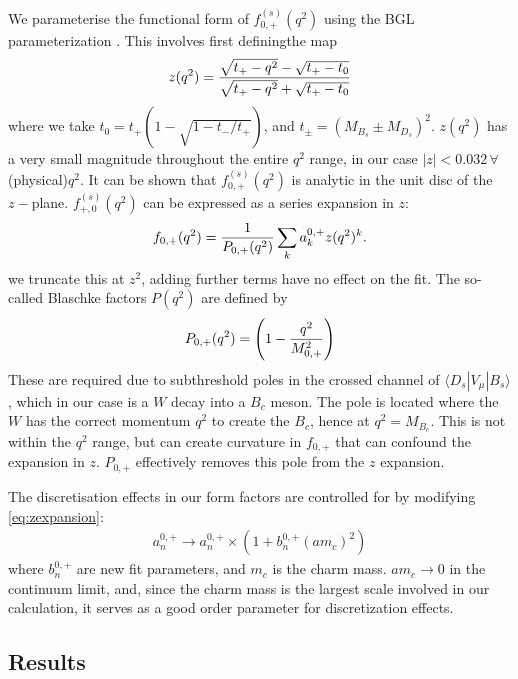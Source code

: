 We parameterise the functional form of $f^{(s)}_{0,+}(q^2)$ using the BGL parameterization \cite{PhysRevD.79.013008}. This involves first definingthe map
\begin{align}
	z(q^2) = {\sqrt{t_+ - q^2} - \sqrt{t_+ - t_0} \over \sqrt{t_+ - q^2} + \sqrt{t_+ - t_0} }
\end{align}
where we take $t_0 = t_+( 1 - \sqrt{1 - t_-/t_+})$, and $t_{\pm} = (M_{B_s} \pm M_{D_s})^2$. $z(q^2)$ has a very small magnitude throughout the entire $q^2$ range, in our case $|z| < 0.032 \,\forall\, $(physical)$ q^2$. It can be shown that $f_{0,+}^{(s)}(q^2)$ is analytic in the unit disc of the $z-$plane. $f^{(s)}_{+,0}(q^2)$ can be expressed as a series expansion in $z$:
\begin{align}
	f_{0,+}(q^2) = {1\over P_{0,+}(q^2)} \sum_k a^{0,+}_k z(q^2)^k.
	\label{eq:zexpansion}
\end{align}
we truncate this at $z^2$, adding further terms have no effect on the fit. The so-called Blaschke factors $P(q^2)$
are defined by
\begin{align}
	P_{0,+}(q^2) = \left( 1 - {q^2\over M_{0,+}^2}\right)
\end{align}
These are required due to subthreshold poles in the crossed channel of $\langle D_s | V_{\mu} | B_s \rangle$, which in our case is a $W$ decay into a $B_c$ meson. The pole is located where the $W$ has the correct momentum $q^2$ to create the $B_c$, hence at $q^2=M_{B_c}$. This is not within the $q^2$ range, but can create curvature in $f_{0,+}$ that can confound the expansion in $z$. $P_{0,+}$ effectively removes this pole from the $z$ expansion.

The discretisation effects in our form factors are controlled for by modifying \eqref{eq:zexpansion}:
\begin{align}
	a^{0,+}_n \to a^{0,+}_n \times ( 1 + b^{0,+}_n (am_c)^2 )
\end{align}
where $b^{0,+}_n$ are new fit parameters, and $m_c$ is the charm mass. $am_c\to0$ in the continuum limit, and, since the charm mass is the largest scale involved in our calculation, it serves as a good order parameter for discretization effects. 

\subsection{Results}

